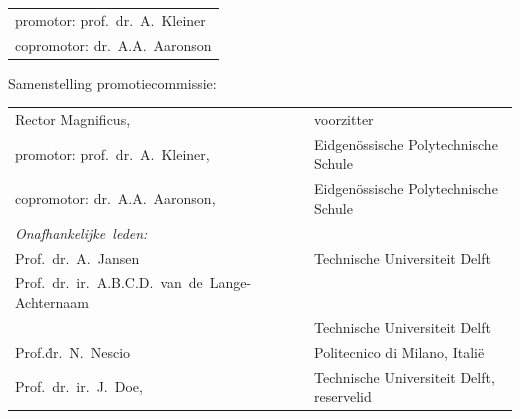 \begin{titlepage}
\medskip\noindent
\begin{tabular}{l}
    promotor: prof.\ dr.\ A.\ Kleiner \\
    copromotor: dr.\ A.A.\ Aaronson
\end{tabular}

\bigskip
\noindent Samenstelling promotiecommissie:

\medskip\noindent
\begin{tabular}{p{5cm}l}
    Rector Magnificus, & voorzitter \\
    promotor: prof.\ dr.\ A.\ Kleiner, & Eidgenössische Polytechnische Schule \\
    copromotor: dr.\ A.A.\ Aaronson, & Eidgenössische Polytechnische Schule \\

    \medskip
    \mbox{\emph{Onafhankelijke leden:}} & \\
    
    Prof.\ dr.\ A.\ Jansen & Technische Universiteit Delft \\
    \mbox{Prof.\ dr.\ ir.\ A.B.C.D.\ van de Lange-Achternaam} & \\
      & Technische Universiteit Delft \\
    Prof.\.dr.\ N.\ Nescio & Politecnico di Milano, Itali\"e \\
    Prof.\ dr.\ ir.\ J.\ Doe, & Technische Universiteit Delft, reservelid \\
    
    
\end{tabular}


\end{titlepage}
